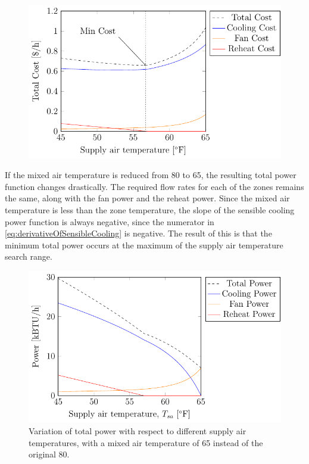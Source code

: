 \begin{figure}
\centering
\includegraphics{Plots/35-SimplifiedExampleCostHighMAT/simplifiedExampleCostHighMAT.pdf}
\caption{}
\label{fig:simplifiedExampleCost}
\end{figure}

If the mixed air temperature is reduced from \SI{80}{\degreeF} to
\SI{65}{\degreeF}, the resulting total power function changes
drastically. The required flow rates for each of the zones remains the
same, along with the fan power and the reheat power. Since the mixed air
temperature is less than the zone temperature, the slope of the sensible
cooling power function is always negative, since the numerator in
 \ref{eq:derivativeOfSensibleCooling} is negative. The
result of this is that the minimum total power occurs at the maximum of
the supply air temperature search range.   

\newcommand{\variationCaptionLowMAT}[1]{Variation of total #1 with respect to different supply air
temperatures, with a mixed air temperature of \SI{65}{\degreeF} instead
of the original \SI{80}{\degreeF}.}

\begin{figure}
\centering
\includegraphics{Plots/34-SimplifiedExampleLowerMAT/simplifiedExampleLowerMAT.pdf}
\caption{\variationCaptionLowMAT{power}}
\label{fig:simplifiedExamplePowerLowerMAT}
\end{figure}

